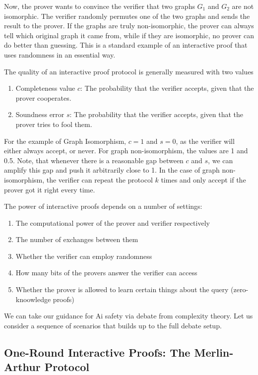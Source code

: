 \documentclass[11pt]{article}
\begin{document}
\begin{example}
Now, the prover wants to convince the verifier that two graphs $G_1$ and $G_2$ are not isomorphic. The verifier randomly permutes one of the two graphs and sends the result to the prover. If the graphs are truly non-isomorphic, the prover can always tell which original graph it came from, while if they are isomorphic, no prover can do better than guessing. This is a standard example of an interactive proof that uses randomness in an essential way.
\end{example}
%
The quality of an interactive proof protocol is generally measured with two values
\begin{enumerate}
 \item Completeness value $c$: The probability that the verifier accepts, given that the prover cooperates.
 \item Soundness error $s$: The probability that the verifier accepts, given that the prover tries to fool them.
\end{enumerate}

For the example of Graph Isomorphism, $c=1$ and $s=0$, as the verifier will either always accept, or never. For graph non-isomorphism, the values are 1 and 0.5. Note, that whenever there is a reasonable gap between $c$ and $s$, we can amplify this gap and push it arbitrarily close to 1. In the case of graph non-isomorphism, the verifier can repeat the protocol $k$ times and only accept if the prover got it right every time.

The power of interactive proofs depends on a number of settings:
\begin{enumerate}
 \item The computational power of the prover and verifier respectively
 \item The number of exchanges between them
 \item Whether the verifier can employ randomness
 \item How many bits of the provers answer the verifier can access
 \item Whether the prover is allowed to learn certain things about the query (zero-knoowledge proofs)
\end{enumerate}

We can take our guidance for Ai safety via debate from complexity theory. Let us consider a sequence of scenarios that builds up to the full debate setup.

\subsection{One-Round Interactive Proofs: The Merlin-Arthur Protocol}
\end{document}
